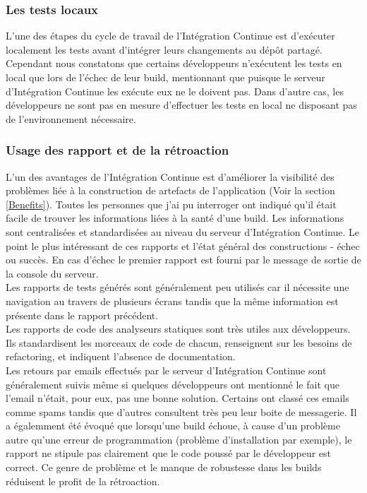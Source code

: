       \subsubsection{Les tests locaux}
      L'une des étapes du cycle de travail de l'Intégration Continue est d'exécuter localement les tests avant d'intégrer leurs changements au dépôt partagé. Cependant nous constatons que certains développeurs n'exécutent les tests en local que lors de l'échec de leur build, mentionnant que puisque le serveur d'Intégration Continue les exécute eux ne le doivent pas. Dans d'autre cas, les développeurs ne sont pas en mesure d'effectuer les tests en local ne disposant pas de l'environnement nécessaire.

      \subsubsection{Usage des rapport et de la rétroaction}
      L'un des avantages de l'Intégration Continue est d'améliorer la visibilité des problèmes liée à la construction de artefacts de l'application (Voir la section \ref{Benefits}). Toutes les personnes que j'ai pu interroger ont indiqué qu'il était facile de trouver les informations liées à la santé d'une build. Les informations sont centralisées et standardisées au niveau du serveur d'Intégration Continue. Le point le plus intéressant de ces rapports et l'état général des constructions - échec ou succès. En cas d'échec le premier rapport est fourni par le message de sortie de la console du serveur.\\

      Les rapports de tests générés sont généralement peu utilisés car il nécessite une navigation au travers de plusieurs écrans tandis que la même information est présente dans le rapport précédent.\\

      Les rapports de code des analyseurs statiques sont très utiles aux développeurs. Ils standardisent les morceaux de code de chacun, renseignent sur les besoins de refactoring, et indiquent l'absence de documentation.\\

      Les retours par emails effectués par le serveur d'Intégration Continue sont généralement suivis même si quelques développeurs ont mentionné le fait que l'email n'était, pour eux, pas une bonne solution. Certains ont classé ces emails comme spams tandis que d'autres consultent très peu leur boite de messagerie. Il a égalemment été évoqué que lorsqu'une build échoue, à cause d'un problème autre qu'une erreur de programmation (problème d'installation par exemple), le rapport ne stipule pas clairement que le code poussé par le développeur est correct. Ce genre de problème et le manque de robustesse dans les builds réduisent le profit de la rétroaction.\\

